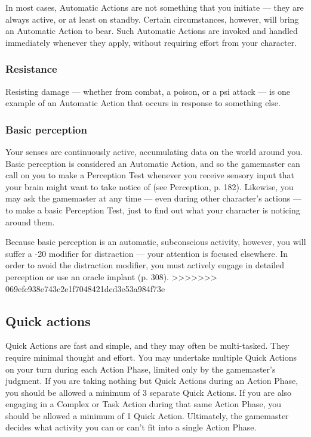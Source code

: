 In most cases, Automatic Actions are not something that you initiate --- they are always active, or at least on standby. Certain circumstances, however, will bring an Automatic Action to bear. Such Automatic Actions are invoked and handled immediately whenever they apply, without requiring effort from your character.

\subsubsection{Resistance}

Resisting damage --- whether from combat, a poison, or a psi attack --- is one example of an Automatic Action that occurs in response to something else.

\subsubsection{Basic perception}

Your senses are continuously active, accumulating data on the world around you. Basic perception is considered an Automatic Action, and so the gamemaster can call on you to make a Perception Test whenever you receive sensory input that your brain might want to take notice of (see Perception, p. 182). Likewise, you may ask the gamemaster at any time --- even during other character’s actions --- to make a basic Perception Test, just to find out what your character is noticing around them.

Because basic perception is an automatic, subconscious activity, however, you will suffer a -20 modifier for distraction --- your attention is focused elsewhere. In order to avoid the distraction modifier, you must actively engage in detailed perception or use an oracle implant (p. 308).
>>>>>>> 069efc938e743c2e1f7048421dcd3e53a984f73e


\subsection{Quick actions}
\label{sec:combat-quick-actions}

Quick Actions are fast and simple, and they may often be multi-tasked. They require minimal thought and effort. You may undertake multiple Quick Actions on your turn during each Action Phase, limited only by the gamemaster’s judgment. If you are taking nothing but Quick Actions during an Action Phase, you should be allowed a minimum of 3 separate Quick Actions. If you are also engaging in a Complex or Task Action during that same Action Phase, you should be allowed a minimum of 1 Quick Action. Ultimately, the gamemaster decides what activity you can or can’t fit into a single Action Phase.

